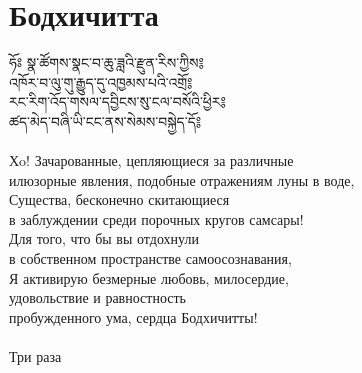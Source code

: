 \newpage

\section{Бодхичитта}

\ti
ཧོཿ སྣ་ཚོགས་སྣང་བ་ཆུ་ཟླའི་རྫུན་རིས་ཀྱིས༔\\
འཁོར་བ་ལུ་གུ་རྒྱུད་དུ་འཁྱམས་པའི་འགྲོ༔\\
རང་རིག་འོད་གསལ་དབྱིངས་སུ་ངལ་བསོའི་ཕྱིར༔\\
ཚད་མེད་བཞི་ཡི་ངང་ནས་སེམས་བསྐྱེད་དོ༔\\
\\
\ru
Хo! Зачарованные, цепляющиеся за различные \\
\indent илюзорные явления, подобные отражениям луны в воде,\\
Существа, бесконечно скитающиеся\\
\indent в заблуждении среди порочных кругов самсары!\\
Для того, что бы вы отдохнули\\
\indent в собственном пространстве самоосознавания,\\
Я активирую безмерные любовь, милосердие,\\
\indent удовольствие и равностность\\
\indent пробужденного ума, сердца Бодхичитты!\\
\\
Три раза

